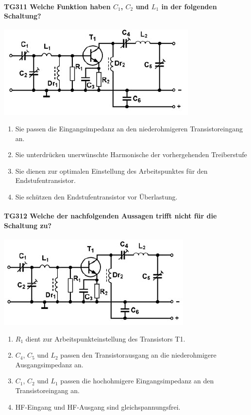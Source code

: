 \documentclass[8pt]{article}
\begin{document}
\paragraph*{TG311 Welche Funktion haben $C_{1}$, $C_{2}$ und $L_{1}$ in der folgenden Schaltung?}
\begin{center}
	\begin{minipage}{\linewidth}
		\centering
		\includegraphics[scale=1.0]{pics/tg311_a.jpg}
	\end{minipage}
\end{center}
\begin{enumerate}[nolistsep,label=\Alph*]
\item Sie passen die Eingangsimpedanz an den niederohmigeren Transistoreingang an.
\item Sie unterdrücken unerwünschte Harmonische der vorhergehenden Treiberstufe
\item Sie dienen zur optimalen Einstellung des Arbeitspunktes für den Endstufentransistor.
\item Sie schützen den Endstufentransistor vor Überlastung. 
\end{enumerate}

\paragraph*{TG312 Welche der nachfolgenden Aussagen trifft nicht für die Schaltung zu?}
\begin{center}
	\begin{minipage}{\linewidth}
		\centering
		\includegraphics[scale=1.0]{pics/tg312_a.jpg}
	\end{minipage}
\end{center}
\begin{enumerate}[nolistsep,label=\Alph*]
\item $R_{1}$ dient zur Arbeitspunkteinstellung des Transistors T1.
\item $C_{4}$, $C_{5}$ und $L_{2}$ passen den Transistorausgang an die niederohmigere Ausgangsimpedanz an.
\item $C_{1}$, $C_{2}$ und $L_{1}$ passen die hochohmigere Eingangsimpedanz an den Transistoreingang an.
\item HF-Eingang und HF-Ausgang sind gleichspannungsfrei.
\end{enumerate}
\end{document}
